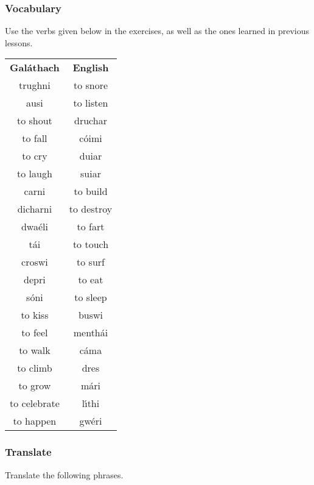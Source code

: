 \subsubsection{Vocabulary}

Use the verbs given below in the exercises, as well as the ones learned in previous lessons.

\begin{table}[H]
\centering
\begin{tabular}{cc}
  \toprule
  \textbf{Gal\'{a}thach} & \textbf{English}\\
  \cmidrule(lr){1-1}\cmidrule(lr){2-2}
  trughni & to snore\\
  ausi & to listen\\
  to shout & druchar\\
  to fall & c\'{o}imi\\
  to cry & duiar\\
  to laugh & suiar\\
  carni & to build\\
  dicharni & to destroy\\
  dwa\'{e}li & to fart\\
  t\'{a}i & to touch\\
  croswi & to surf\\
  depri & to eat\\
  s\'{o}ni & to sleep\\
  to kiss & buswi\\
  to feel & menth\'{a}i\\
  to walk & c\'{a}ma\\
  to climb & dres\\
  to grow & m\'{a}ri\\
  to celebrate & l\'{\i}thi\\
  to happen & gw\'{e}ri\\
  \bottomrule
\end{tabular}
\label{vocab_exercise_lesson14}
\end{table}

\subsubsection{Translate}

Translate the following phrases.

